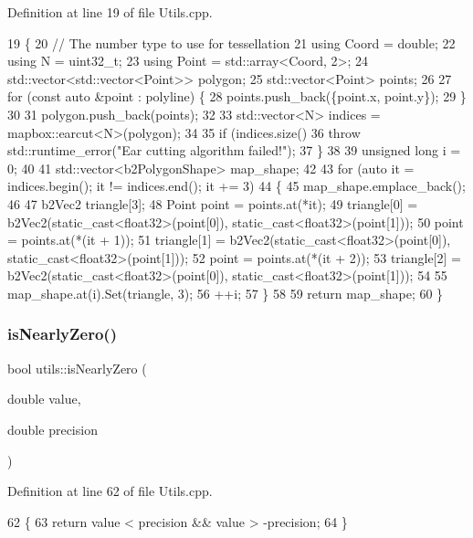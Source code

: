 Definition at line 19 of file Utils.\+cpp.


\begin{DoxyCode}
19                                                                                \{
20     \textcolor{comment}{// The number type to use for tessellation}
21     \textcolor{keyword}{using} Coord = double;
22     \textcolor{keyword}{using} N = uint32\_t;
23     \textcolor{keyword}{using} Point = std::array<Coord, 2>;
24     std::vector<std::vector<Point>> polygon;
25     std::vector<Point> points;
26 
27     \textcolor{keywordflow}{for} (\textcolor{keyword}{const} \textcolor{keyword}{auto} &point : polyline) \{
28         points.push\_back(\{point.x, point.y\});
29     \}
30 
31     polygon.push\_back(points);
32 
33     std::vector<N> indices = mapbox::earcut<N>(polygon);
34 
35     \textcolor{keywordflow}{if} (indices.size() %
36         \textcolor{keywordflow}{throw} std::runtime\_error(\textcolor{stringliteral}{"Ear cutting algorithm failed!"});
37     \}
38 
39     \textcolor{keywordtype}{unsigned} \textcolor{keywordtype}{long} i = 0;
40 
41     std::vector<b2PolygonShape> map\_shape;
42 
43     \textcolor{keywordflow}{for} (\textcolor{keyword}{auto} it = indices.begin(); it != indices.end(); it += 3)
44     \{
45         map\_shape.emplace\_back();
46 
47         b2Vec2 triangle[3];
48         Point point = points.at(*it);
49         triangle[0] = b2Vec2(static\_cast<float32>(point[0]), static\_cast<float32>(point[1]));
50         point = points.at(*(it + 1));
51         triangle[1] = b2Vec2(static\_cast<float32>(point[0]), static\_cast<float32>(point[1]));
52         point = points.at(*(it + 2));
53         triangle[2] = b2Vec2(static\_cast<float32>(point[0]), static\_cast<float32>(point[1]));
54 
55         map\_shape.at(i).Set(triangle, 3);
56         ++i;
57     \}
58 
59     \textcolor{keywordflow}{return} map\_shape;
60 \}
\end{DoxyCode}
\mbox{\label{namespaceutils_a1fe70cdae64372e591da8985d7a884d6}} 
\subsubsection{\texorpdfstring{is\+Nearly\+Zero()}{isNearlyZero()}}
{\footnotesize\ttfamily bool utils\+::is\+Nearly\+Zero (\begin{DoxyParamCaption}\item[{double}]{value,  }\item[{double}]{precision }\end{DoxyParamCaption})}



Definition at line 62 of file Utils.\+cpp.


\begin{DoxyCode}
62                                                   \{
63     \textcolor{keywordflow}{return} value < precision && value > -precision;
64 \}
\end{DoxyCode}
